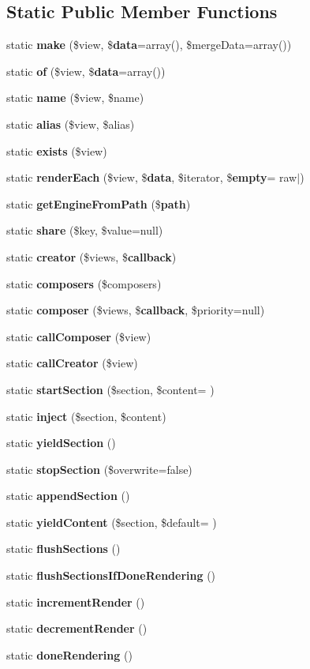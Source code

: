 \subsection*{Static Public Member Functions}
\begin{DoxyCompactItemize}
\item 
static {\bf make} (\$view, \${\bf data}=array(), \$merge\+Data=array())
\item 
static {\bf of} (\$view, \${\bf data}=array())
\item 
static {\bf name} (\$view, \$name)
\item 
static {\bf alias} (\$view, \$alias)
\item 
static {\bf exists} (\$view)
\item 
static {\bf render\+Each} (\$view, \${\bf data}, \$iterator, \${\bf empty}= \textquotesingle{}raw$\vert$\textquotesingle{})
\item 
static {\bf get\+Engine\+From\+Path} (\${\bf path})
\item 
static {\bf share} (\$key, \$value=null)
\item 
static {\bf creator} (\$views, \${\bf callback})
\item 
static {\bf composers} (\$composers)
\item 
static {\bf composer} (\$views, \${\bf callback}, \$priority=null)
\item 
static {\bf call\+Composer} (\$view)
\item 
static {\bf call\+Creator} (\$view)
\item 
static {\bf start\+Section} (\$section, \$content= \textquotesingle{}\textquotesingle{})
\item 
static {\bf inject} (\$section, \$content)
\item 
static {\bf yield\+Section} ()
\item 
static {\bf stop\+Section} (\$overwrite=false)
\item 
static {\bf append\+Section} ()
\item 
static {\bf yield\+Content} (\$section, \$default= \textquotesingle{}\textquotesingle{})
\item 
static {\bf flush\+Sections} ()
\item 
static {\bf flush\+Sections\+If\+Done\+Rendering} ()
\item 
static {\bf increment\+Render} ()
\item 
static {\bf decrement\+Render} ()
\item 
static {\bf done\+Rendering} ()
\item 

\end{DoxyCompactItemize}
